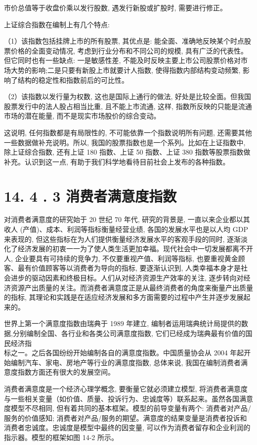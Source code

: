 \documentclass[10pt]{article}
\begin{document}
\begin{CJK*}{UTF8}{bsmi}
市价总值等于收盘价乘以发行股数, 遇发行新股或扩股时, 需要进行修正。

上证综合指数在编制上有几个特点:

（1）该指数包括挂牌上市的所有股票, 其优点是: 能全面、准确地反映某个时点股票价格的全面变动情况, 考虑到行业分布和不同公司的规模, 具有广泛的代表性。但它同时也有一些缺点: 一是敏感性差, 不能及时反映主要上市公司股票价格对市场大势的影响;二是只要有新股上市就要计人指数, 使得指数内部结构变动频繁, 影响了结构的稳定性和指数前后的可比性。

（2）该指数以发行量为权数, 这也是国际上通行的做法, 好处是比较全面。但我国股票发行中的法人股占相当比重, 且不能上市流通, 这样, 指数所反映的只能是流通市场的潜在能量, 而不是现实市场股价的综合变动。

这说明, 任何指数都是有局限性的, 不可能依靠一个指数说明所有问题, 还需要其他一些数据做补充说明。所以, 我国的股票指数也是一个系列。比如在上证指数中, 除上证综合指数, 还有上证 180 指数、上证 50 指数、上证 380 指数等股票指数做补充。认识到这一点, 有助于我们科学地看待目前社会上发布的各种指数。

\section*{14. 4 . 3 消费者满意度指数}
对消费者满意度的研究始于 20 世纪 70 年代, 研究的背景是, 一直以来企业都以其收人 (产值)、成本、利润等指标衡量经营业绩, 各国的发展水平也是以人均 GDP 来表现的, 但这些指标在为人们提供衡量经济发展水平的客观手段的同时, 逐渐淡化了经济发展的初衷一一为了使人类生活更加幸福。现代社会中一切发展都离不开人, 企业要具有可持续的竞争力, 不仅要重视产值、利润等指标, 也要重视黄金顾客、最有价值顾客等以消费者为导向的指标, 要逐渐认识到, 人类幸福本身才是社会进步的驱动因素和终极目标。人们从对经济资源生产效率的关注, 逐步转向对经济资源产出质量的关注。而消费者满意度正是从最终消费者的角度来衡量产出质量的指标, 其理论和实践是在适应经济发展和多方面需要的过程中产生并逐步发展起来的。

世界上第一个满意度指数由瑞典于 1989 年建立, 编制者运用瑞典统计局提供的数据,分别编制全国、各行业和各类公司满意度指数, 它们已经成为瑞典最有价值的国民经济指\\
标之一。之后各国纷纷开始编制各自的满意度指数。中国质量协会从 2004 年起开始编制汽车、家电、房地产等行业的满意度指数, 总体来说, 我国在编制消费者满意度指数方面还有很大的发展空间。

消费者满意度是一个经济心理学概念, 要衡量它就必须建立模型, 将消费者满意度与一些相关变量（如价值、质量、投诉行为、忠诚度等）联系起来。虽然各国满意度模型不尽相同, 但有着共同的基本框架。模型的前导变量有两个: 消费者对产品/服务的价值感知; 消费者对产品/服务的期望。满意度的结果变量是消费者投诉和消费者忠诚度。忠诚度是模型中最终的因变量, 可以作为消费者留存和企业利润的指示器。模型的框架如图 14-2 所示。


\end{CJK*}
\end{document}
